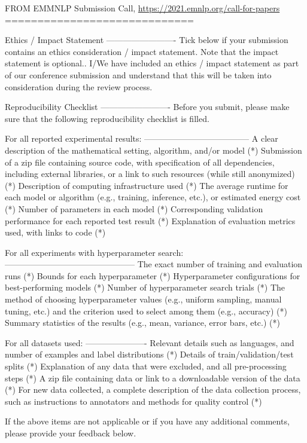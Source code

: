 \documentclass[manuscript, nonacm]{acmart}
\begin{document}
FROM EMMNLP Submission Call,
\url{https://2021.emnlp.org/call-for-papers}
=============================

Ethics / Impact Statement
-------------------------
Tick below if your submission contains an ethics consideration / impact statement. Note that the impact statement is optional..
  I/We have included an ethics / impact statement as part of our conference submission and understand that this will be taken into consideration during the review process.  
  
  
Reproducibility Checklist
-------------------------
Before you submit, please make sure that the following reproducibility checklist is filled.

For all reported experimental results:
--------------------------------------
A clear description of the mathematical setting, algorithm, and/or model (*)
Submission of a zip file containing source code, with specification of all dependencies, including external libraries, or a link to such resources (while still anonymized) (*)
Description of computing infrastructure used (*)
The average runtime for each model or algorithm (e.g., training, inference, etc.), or estimated energy cost (*)
Number of parameters in each model (*)
Corresponding validation performance for each reported test result (*)
Explanation of evaluation metrics used, with links to code (*)

For all experiments with hyperparameter search:
-----------------------------------------------
The exact number of training and evaluation runs (*)
Bounds for each hyperparameter (*)
Hyperparameter configurations for best-performing models (*)
Number of hyperparameter search trials (*)
The method of choosing hyperparameter values (e.g., uniform sampling, manual tuning, etc.) and the criterion used to select among them (e.g., accuracy) (*)
Summary statistics of the results (e.g., mean, variance, error bars, etc.) (*)

For all datasets used:
----------------------
Relevant details such as languages, and number of examples and label distributions (*)
Details of train/validation/test splits (*)
Explanation of any data that were excluded, and all pre-processing steps (*)
A zip file containing data or link to a downloadable version of the data (*)
For new data collected, a complete description of the data collection process, such as instructions to annotators and methods for quality control (*)

If the above items are not applicable or if you have any additional comments, please provide your feedback below. 
\end{document}
